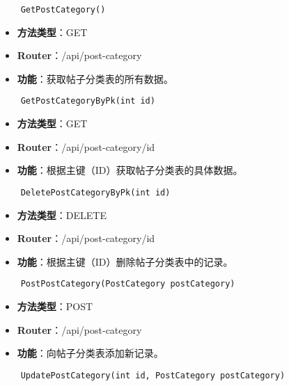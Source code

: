 \begin{verbatim}
	GetPostCategory()
\end{verbatim}

\begin{itemize}
	\item \textbf{方法类型}：GET
	\item \textbf{Router}：/api/post-category
	\item \textbf{功能}：获取帖子分类表的所有数据。
\end{itemize}

\begin{verbatim}
	GetPostCategoryByPk(int id)
\end{verbatim}

\begin{itemize}
	\item \textbf{方法类型}：GET
	\item \textbf{Router}：/api/post-category/{id}
	\item \textbf{功能}：根据主键（ID）获取帖子分类表的具体数据。
\end{itemize}

\begin{verbatim}
	DeletePostCategoryByPk(int id)
\end{verbatim}

\begin{itemize}
	\item \textbf{方法类型}：DELETE
	\item \textbf{Router}：/api/post-category/{id}
	\item \textbf{功能}：根据主键（ID）删除帖子分类表中的记录。
\end{itemize}

\begin{verbatim}
	PostPostCategory(PostCategory postCategory)
\end{verbatim}

\begin{itemize}
	\item \textbf{方法类型}：POST
	\item \textbf{Router}：/api/post-category
	\item \textbf{功能}：向帖子分类表添加新记录。
\end{itemize}

\begin{verbatim}
	UpdatePostCategory(int id, PostCategory postCategory)
\end{verbatim}

